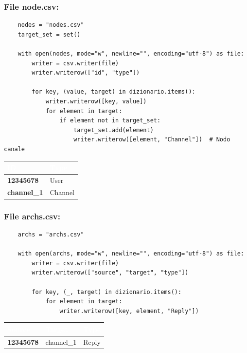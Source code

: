 \documentclass[12pt]{article}
\begin{document}
	\subsubsection{File node.csv:}
	\begin{lstlisting}
	nodes = "nodes.csv"
	target_set = set()
		
	with open(nodes, mode="w", newline="", encoding="utf-8") as file:
		writer = csv.writer(file)
		writer.writerow(["id", "type"])  
		
		for key, (value, target) in dizionario.items():
			writer.writerow([key, value])  
			for element in target:
				if element not in target_set:
					target_set.add(element)
					writer.writerow([element, "Channel"])  # Nodo canale
	\end{lstlisting}
	\begin{table}[h!]
		\centering
		\renewcommand{\arraystretch}{1.5}
		\setlength{\tabcolsep}{12pt}
		\begin{tabular}{|p{6cm}|p{8cm}|}
			\hline
			\cellcolor{darkblue}\textcolor{white}{\textbf{ID}} & \cellcolor{darkblue}\textcolor{white}{\textbf{Type}} \\
			\hline
			\textbf{12345678} & User \\
			\hline
			\textbf{channel\_1} & Channel\\
			\hline
		\end{tabular}
	\end{table}
	\newpage
	\subsubsection{File archs.csv:}
	\begin{lstlisting}
	archs = "archs.csv"
		
	with open(archs, mode="w", newline="", encoding="utf-8") as file:
		writer = csv.writer(file)
		writer.writerow(["source", "target", "type"])
		
		for key, (_, target) in dizionario.items():
			for element in target:
				writer.writerow([key, element, "Reply"])
	\end{lstlisting}
	\begin{table}[h!]
		\centering
		\renewcommand{\arraystretch}{1.5}
		\setlength{\tabcolsep}{12pt}
		\begin{tabular}{|p{5cm}|p{4cm}|p{4cm}|}
			\hline
			\cellcolor{darkblue}\textcolor{white}{\textbf{Source}} & 
			\cellcolor{darkblue}\textcolor{white}{\textbf{Target}} & 
			\cellcolor{darkblue}\textcolor{white}{\textbf{Type}} \\
			\hline
			\textbf{12345678} & channel\_1 & Reply \\
			\hline
		\end{tabular}
	\end{table}
\end{document}
